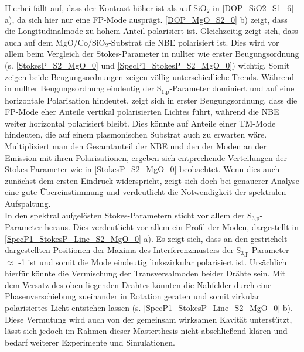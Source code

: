 \begin{figure}[b]
\end{figure}Hierbei fällt auf, dass der Kontrast höher ist als auf SiO$_\text{2}$ in \autoref{DOP_SiO2_S1_6} a), da sich hier nur eine FP-Mode ausprägt. \autoref{DOP_MgO_S2_0} b) zeigt, dass die Longitudinalmode zu hohem Anteil polarisiert ist. Gleichzeitig zeigt sich, dass auch auf dem  MgO/Co/SiO$_\text{2}$-Substrat die NBE polarisiert ist. Dies wird vor allem beim Vergleich der Stokes-Parameter in nullter wie erster Beugungsordnung (s. \autoref{StokesP_S2_MgO_0} und \autoref{SpecP1_StokesP_S2_MgO_0}) wichtig. Somit zeigen beide Beugungsordnungen zeigen völlig unterschiedliche Trends. Während in nullter Beugungsordnung eindeutig der S$_\text{1,p}$-Parameter dominiert und auf eine horizontale Polarisation hindeutet, zeigt sich in erster Beugungsordnung, dass die FP-Mode eher Anteile vertikal polarisierten Lichtes führt, während die NBE weiter horizontal polarisiert bleibt. Dies könnte auf Anteile einer TM-Mode hindeuten, die auf einem plasmonischen Substrat auch zu erwarten wäre. Multipliziert man den Gesamtanteil der NBE  und den der Moden an der Emission mit ihren Polarisationen, ergeben sich entprechende Verteilungen der Stokes-Parameter wie in \autoref{StokesP_S2_MgO_0} beobachtet. Wenn dies auch zunächst dem ersten Eindruck widerspricht, zeigt sich doch bei genauerer Analyse  eine gute Übereinstimmung und verdeutlicht die Notwendigkeit der spektralen Aufspaltung.\\
In den spektral aufgelösten Stokes-Parametern sticht vor allem der S$_\text{3,p}$-Parameter heraus. Dies verdeutlicht vor allem ein Profil der Moden, dargestellt in \autoref{SpecP1_StokesP_Line_S2_MgO_0} a). Es zeigt sich, dass an den gestrichelt dargestellten Positionen der Maxima des Interferenzmusters der S$_\text{3,p}$-Parameter $\approx$ -1 ist und somit die Mode eindeutig linkszirkular polarisiert ist. Ursächlich hierfür könnte die Vermischung der Transversalmoden beider Drähte sein. Mit dem Versatz des oben liegenden Drahtes könnten die Nahfelder durch eine Phasenverschiebung zueinander in Rotation geraten und somit zirkular polarisiertes Licht entstehen lassen (s. \autoref{SpecP1_StokesP_Line_S2_MgO_0} b). Diese Vermutung wird auch von der gemeinsam wirksamen Kavität unterstützt, lässt sich jedoch im Rahmen dieser Masterthesis nicht abschließend klären und bedarf weiterer Experimente und Simulationen. 
